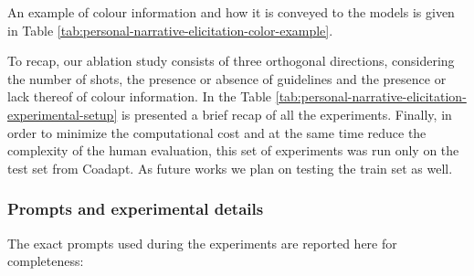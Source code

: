 
An example of colour information and how it is conveyed to the models is given in Table \ref{tab:personal-narrative-elicitation-color-example}. 

To recap, our ablation study consists of three orthogonal directions, considering the number of shots, the presence or absence of guidelines and the presence or lack thereof of colour information. In the Table \ref{tab:personal-narrative-elicitation-experimental-setup} is presented a brief recap of all the experiments. 
Finally, in order to minimize the computational cost and at the same time reduce the complexity of the human evaluation, this set of experiments was run only on the test set from Coadapt. As future works we plan on testing the train set as well.
\subsubsection{Prompts and experimental details}
% 
The exact prompts used during the experiments are reported here for completeness:
